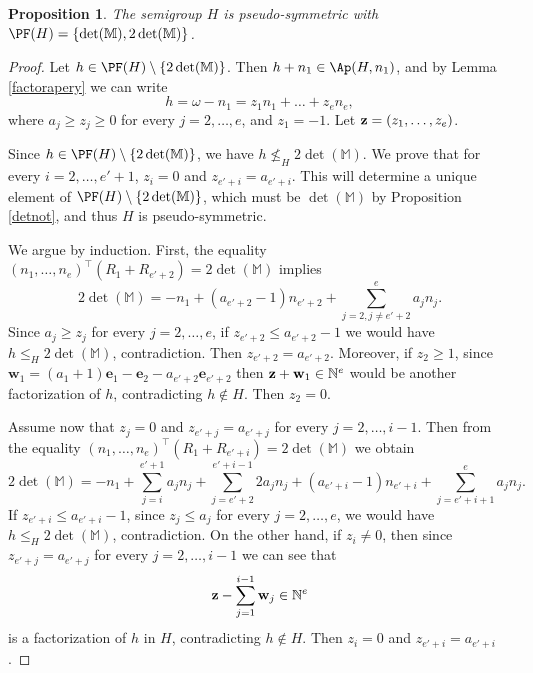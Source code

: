 \documentclass[11pt,twoside]{amsart}
\newcommand{\N}{\mathbb N}
\newcommand{\MM}{\mathbb M}
\def\bw{{\mathbf w}}
\def\be{{\mathbf e}}
\def\bbM{{\mathbb M}}
\newtheorem{prop}[Theorem]{Proposition}
\theoremstyle{definition}
\numberwithin{equation}{section}
\begin{document}
\begin{prop}\label{PropPFfromM}
The  semigroup $H$ is pseudo-symmetric with $\PF(H)=\{\det(\bbM),2\det(\bbM)\}$.
\end{prop}
\begin{proof}
Let $h \in \PF(H) \setminus \{2\det(\bbM)\}$. Then $h+n_1  \in  \Ap(H,n_1)$, and by Lemma \ref{factorapery} we can write $$h=\omega-n_1=z_1n_1+\ldots+z_en_e,$$
where $a_j \ge z_j \ge 0$ for every $j=2,\ldots,e$, and $z_1=-1$. Let ${\bf z}=(z_1,\ldots,z_e)$.

Since $h \in \PF(H) \setminus \{2\det(\bbM)\}$, we have $h \not\le_H 2\det(\bbM)$. We prove that for every $i=2,\ldots,e'+1$, $z_i = 0$ and $z_{e'+i}=a_{e'+i}$. This will determine a unique element of $\PF(H) \setminus \{2\det(\MM)\}$, which must be $\det(\MM)$ by Proposition \ref{detnot}, and thus $H$ is pseudo-symmetric.

We argue by induction. First, the equality $(n_1, \ldots , n_e)^\intercal (R_1+R_{e'+2}) = 2\det(\bbM)$ implies
$$2\det(\bbM)= -n_1+(a_{e'+2}-1)n_{e'+2}+\sum_{j=2,j \ne e'+2}^e a_jn_j.$$
Since $a_j \ge z_j$ for every $j=2,\ldots,e$, if $z_{e'+2} \le a_{e'+2}-1$ we would have $h \le_H 2\det(\bbM)$, contradiction. 
Then $z_{e'+2}=a_{e'+2}$.
Moreover, if $z_2 \ge 1$, since $\bw_1=(a_1+1)\be_1-\be_2-a_{e'+2}\be_{e'+2}$ then ${\bf z}+\bw_1 \in \N^e$ would be another factorization of $h$, contradicting $h \not \in H$.
Then $z_2=0$.

Assume now that $z_j=0$ and $z_{e'+j}=a_{e'+j}$ for every $j=2,\ldots,i-1$. Then from the equality $(n_1, \ldots , n_e)^\intercal (R_1+R_{e'+i}) = 2\det(\bbM)$ we obtain
\begin{equation}\label{Eqni2det}
2\det(\bbM)= -n_1+\sum_{j=i}^{e'+1} a_jn_j + \sum_{j=e'+2}^{e'+i-1}2a_jn_j+ (a_{e'+i}-1)n_{e'+i}+\sum_{j=e'+i+1}^{e} a_jn_j.
\end{equation}
If $z_{e'+i} \le a_{e'+i}-1$, since $z_j \le a_j$ for every $j=2,\ldots,e$, we would have $h \le_H 2\det(\bbM)$, contradiction.
On the other hand, if $z_i \ne 0$, then since $z_{e'+j}=a_{e'+j}$ for every $j=2,\ldots,i-1$ we can see that $${\bf z}-\sum_{j=1}^{i-1} \bw_j \in \N^e$$
is a factorization of $h$ in $H$, contradicting $h \notin H$. Then $z_i=0$ and $z_{e'+i}=a_{e'+i}$.
\end{proof}
\end{document}
